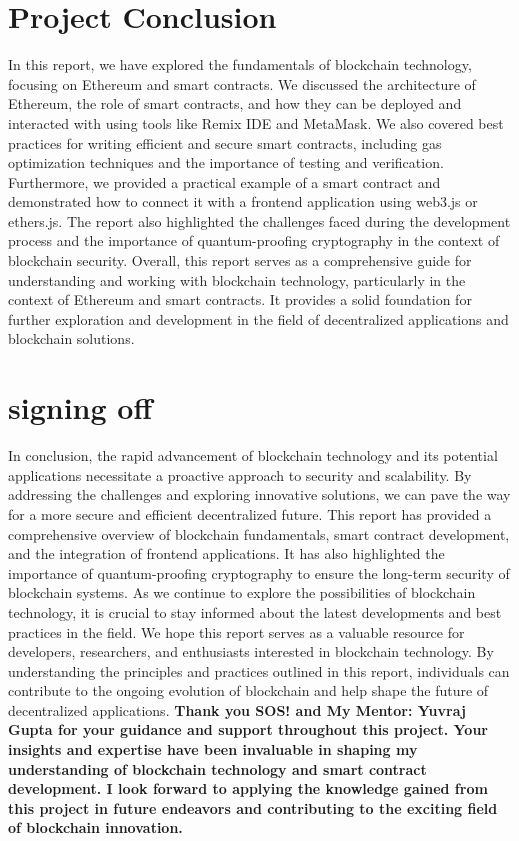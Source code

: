 \documentclass[12pt, a4paper]{article}
\begin{document}
\section{Project Conclusion}
In this report, we have explored the fundamentals of blockchain technology, focusing on Ethereum and smart contracts. We discussed the architecture of Ethereum, the role of smart contracts, and how they can be deployed and interacted with using tools like Remix IDE and MetaMask. We also covered best practices for writing efficient and secure smart contracts, including gas optimization techniques and the importance of testing and verification.
Furthermore, we provided a practical example of a smart contract and demonstrated how to connect it with a frontend application using web3.js or ethers.js. The report also highlighted the challenges faced during the development process and the importance of quantum-proofing cryptography in the context of blockchain security.
\newline
Overall, this report serves as a comprehensive guide for understanding and working with blockchain technology, particularly in the context of Ethereum and smart contracts. It provides a solid foundation for further exploration and development in the field of decentralized applications and blockchain solutions.
\section{signing off}
In conclusion, the rapid advancement of blockchain technology and its potential applications necessitate a proactive approach to security and scalability. By addressing the challenges and exploring innovative solutions, we can pave the way for a more secure and efficient decentralized future.
\newline
This report has provided a comprehensive overview of blockchain fundamentals, smart contract development, and the integration of frontend applications. It has also highlighted the importance of quantum-proofing cryptography to ensure the long-term security of blockchain systems. As we continue to explore the possibilities of blockchain technology, it is crucial to stay informed about the latest developments and best practices in the field.
\newline
We hope this report serves as a valuable resource for developers, researchers, and enthusiasts interested in blockchain technology. By understanding the principles and practices outlined in this report, individuals can contribute to the ongoing evolution of blockchain and help shape the future of decentralized applications.
\newline
\textbf{Thank you SOS! and My Mentor: Yuvraj Gupta for your guidance and support throughout this project. Your insights and expertise have been invaluable in shaping my understanding of blockchain technology and smart contract development. I look forward to applying the knowledge gained from this project in future endeavors and contributing to the exciting field of blockchain innovation.}
\end{document}
